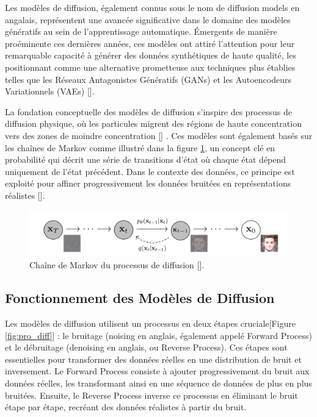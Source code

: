 Les modèles de diffusion, également connus sous le nom de diffusion models en
angalais, représentent une avancée significative dans le domaine des modèles
génératifs au sein de l'apprentissage automatique. Émergents de manière
proéminente ces dernières années, ces modèles ont attiré l'attention pour leur
remarquable capacité à générer des données synthétiques de haute qualité, les
positionnant comme une alternative prometteuse aux techniques plus établies
telles que les Réseaux Antagonistes Génératifs (GANs) et les Autoencodeurs
Variationnels (VAEs) [\cite{dhariwal2021diffusion}].

La fondation conceptuelle des modèles de diffusion s'inspire des processus de
diffusion physique, où les particules migrent des régions de haute
concentration vers des zones de moindre concentration [\cite{ho2020denoising}]
. Ces modèles sont également basés sur les chaînes de Markov comme illustré
dans la figure \ref{fig:markov}, un concept clé en probabilité qui décrit une
série de transitions d'état où chaque état dépend uniquement de l'état
précédent. Dans le contexte des données, ce principe est exploité pour affiner
progressivement les données bruitées en représentations réalistes
[\cite{yang2022diffusion}].

\begin{figure}[hbt!]
	\centering
	\includegraphics[width=12cm]{images_pfe/markov.png}
	\caption{Chaîne de Markov du processus de diffusion [\cite{ho2020denoising}].}
	\label{fig:markov}
\end{figure}
\FloatBarrier

\subsection{Fonctionnement des Modèles de Diffusion}

Les modèles de diffusion utilisent un processus en deux étapes cruciale[Figure
		\ref{fig:pro_diff}] : le bruitage (noising en anglais, également appelé Forward
Process) et le débruitage (denoising en anglais, ou Reverse Process). Ces
étapes sont essentielles pour transformer des données réelles en une
distribution de bruit et inversement. Le Forward Process consiste à ajouter
progressivement du bruit aux données réelles, les transformant ainsi en une
séquence de données de plus en plus bruitées. Ensuite, le Reverse Process
inverse ce processus en éliminant le bruit étape par étape, recréant des
données réalistes à partir du bruit.

